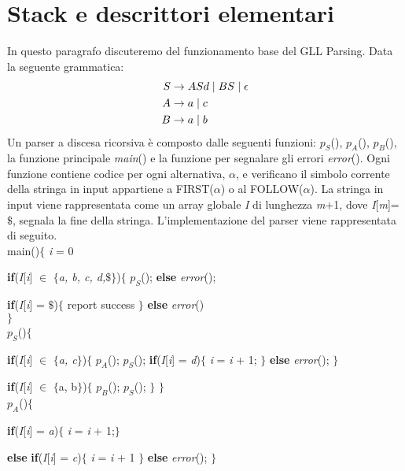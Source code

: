\section{Stack e descrittori elementari}\label{par1}
In questo paragrafo discuteremo del funzionamento base del GLL Parsing. Data la seguente grammatica:
\begin{align}\label{gram3}
	S & \to ASd \mid BS \mid \epsilon \notag \\
	A & \to a \mid c \notag \\
	B & \to a \mid b 
\end{align}
Un parser a discesa ricorsiva \cite{pubblicazione: scott} è composto dalle seguenti funzioni: $p_S$(), $p_A$(), $p_B$(), la funzione principale \textit{main}() e la funzione per segnalare gli errori \textit{error}(). Ogni funzione contiene codice per ogni alternativa, $\alpha$, e verificano il simbolo corrente della stringa in input appartiene a FIRST($\alpha$) o al FOLLOW($\alpha$). La stringa in input viene rappresentata come un array globale \textit{I} di lunghezza \textit{m}+1, dove \textit{I}[\textit{m}]=$\$$, segnala la fine della stringa. L'implementazione del parser viene rappresentata di seguito.\\
main()$\{$ \textit{i} = 0 \par
\hspace{1cm}\textbf{if}(\textit{I}[\textit{i}] $\in$ $\{$\textit{a, b, c, d,$\$$}$\}$)$\{$ $p_S$(); \textbf{else} \textit{error}();\par
\hspace{1cm}\textbf{if}(\textit{I}[\textit{i}] = $\$$)$\{$ report success $\}$ \textbf{else} \textit{error}()\\	
$\}$\\
$p_S$()$\{$ \par
\hspace{0.5cm}\textbf{if}(\textit{I}[\textit{i}] $\in$ $\{$\textit{a, c}$\}$)$\{$ $p_A$(); $p_S$(); \textbf{if}(\textit{I}[\textit{i}] = \textit{d})$\{$ \textit{i} = \textit{i} + 1; $\}$ \textbf{else} \textit{error}(); $\}$\par
\hspace{0.5cm}\textbf{if}(\textit{I}[\textit{i}] $\in$ $\{$a, b$\}$)$\{$ $p_B$(); $p_S$(); $\}$ $\}$\\
$p_A$()$\{$ \par
\hspace{0.5cm}\textbf{if}(\textit{I}[\textit{i}] = \textit{a})$\{$ \textit{i} = \textit{i} + 1;$\}$\par \hspace{0.5cm}\textbf{else} \textbf{if}(\textit{I}[\textit{i}] = \textit{c})$\{$ \textit{i} = \textit{i} + 1 $\}$ \textbf{else} \textit{error}(); $\}$\\
